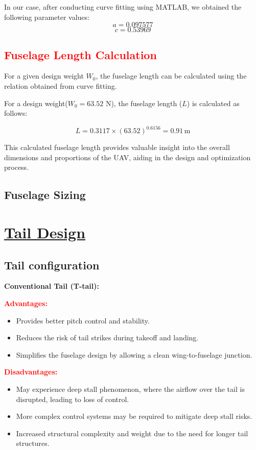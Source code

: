 \documentclass[12 pt]{article}
\begin{document}
{In our case, after conducting curve fitting using MATLAB, we obtained the following parameter values:
\[ a = 0.097577 \]
\[ c = 0.53969 \] 
\newpage
\subsection{\textcolor{red}{Fuselage Length Calculation}}
\color{black}
For a given design weight \(W_0\), the fuselage length can be calculated using the relation obtained from curve fitting. 

For a design weight(\(W_0 = 63.52\) N), the fuselage length (\(L\)) is calculated as follows:

\[
L = 0.3117 \times (63.52)^{0.6156} = 0.91 \, \text{m}
\]

This calculated fuselage length provides valuable insight into the overall dimensions and proportions of the UAV, aiding in the design and optimization process.
\color{red}
\subsection{Fuselage Sizing}
\color{black}
\vspace{10mm}
\section{\underline{Tail Design}}
\color{red}
\subsection{Tail configuration}

{\color{red}\textbf{Conventional Tail (T-tail):}}

{\color{black}
\textbf{\textcolor{red}{Advantages:}}
\begin{itemize}
  \item Provides better pitch control and stability.
  \item Reduces the risk of tail strikes during takeoff and landing.
  \item Simplifies the fuselage design by allowing a clean wing-to-fuselage junction.
\end{itemize}

\textbf{\textcolor{red}{Disadvantages:}}
\begin{itemize}
  \item May experience deep stall phenomenon, where the airflow over the tail is disrupted, leading to loss of control.
  \item More complex control systems may be required to mitigate deep stall risks.
  \item Increased structural complexity and weight due to the need for longer tail structures.
\end{itemize}
}

}
\end{document}
